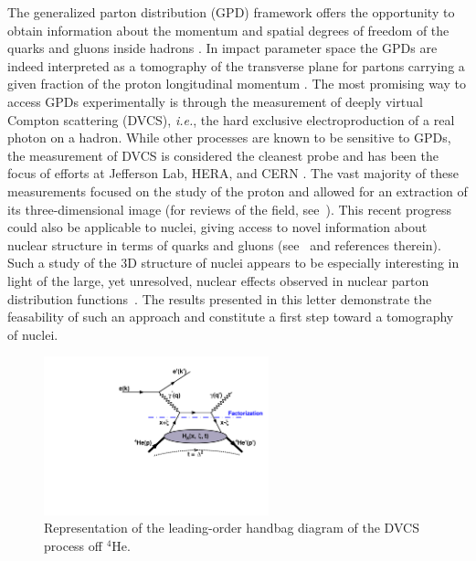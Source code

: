 \documentclass[twocolumn,nofootinbib,showpacs,prl,superscriptaddress,secnumarabic,amssymb,nobibnotes,aps,floatfix]{revtex4}
\begin{document}
The generalized parton distribution (GPD) framework offers the opportunity to 
obtain information about the momentum and spatial degrees of freedom of the 
quarks and gluons inside hadrons \cite{Mueller:1998fv,Ji:1996ek,Ji:1996nm,
Radyushkin:1996nd,Radyushkin:1997ki}. In impact parameter space the GPDs are 
indeed interpreted as a tomography of the transverse plane for partons 
carrying a given fraction of the proton longitudinal momentum 
\cite{Burkardt:2000za,Diehl:2002he,Belitsky:2002ep,Burkardt:2005hp}. The most 
promising way to access GPDs experimentally is through the measurement of 
deeply virtual Compton scattering (DVCS), \textit{i.e.}, the hard exclusive 
electroproduction of a real photon on a hadron. While other processes are known 
to be sensitive to GPDs, the measurement of DVCS is considered the cleanest 
probe and has been the focus of efforts at Jefferson Lab, HERA, and CERN 
\cite{Stepanyan:2001sm,Airapetian,Chekanov:2003ya,Aktas:2005ty,Chen:2006na,
MunozCamacho:2006hx,Girod:2007aa,Mazouz:2007aa,Gavalian:2009,Seder:2015,
Pisano:2015,Jo:2015ema,Joerg:2016hhs}. The vast majority of these measurements 
focused on the study of the proton and allowed for an extraction of its 
three-dimensional image (for reviews of the field, see~\cite{Goeke:2001tz,
Diehl:2003ny,Ji:2004gf,Belitsky:2005qn,Boffi:2007yc,Guidal:2013rya}). This 
recent progress could also be applicable to nuclei, giving access to novel 
information about nuclear structure in terms of quarks and gluons 
(see~\cite{Dupre:2015jha} and references therein). Such a study of the 3D 
structure of nuclei appears to be especially interesting in light of the large, 
yet unresolved, nuclear effects observed in nuclear parton distribution 
functions~\cite{Geesaman:1995yd,Norton:2003cb,Hen:2016kwk}. The results 
presented in this letter demonstrate the feasability of such an approach and 
constitute a first step toward a tomography of nuclei.

\begin{figure}[tb]
\includegraphics[width=6.5cm]{figs/DVCS_diagram.pdf}
\caption{Representation of the leading-order handbag diagram of the DVCS 
process off $^4$He.}
\label{fig:diags}
\end{figure}
\end{document}
